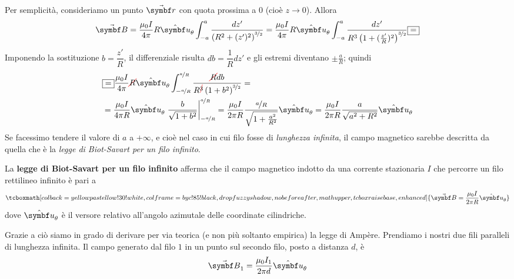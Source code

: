 Per semplicità, consideriamo un punto $\vba{r}$ con quota prossima a $0$ (cioè $z\to 0$). Allora
\begin{equation*}
	\vba{B}=\frac{\mu_0 I}{4\pi}R\vbh{u}_{\theta}\int_{-a}^{a}\frac{dz'}{\left(R^2+(z')^2\right)^{\nicefrac{3}{2}}}=\frac{\mu_0 I}{4\pi}R\vbh{u}_{\theta}\int_{-a}^{a}\frac{dz'}{R^3\left(1+(\frac{z'}{R})^2\right)^{\nicefrac{3}{2}}}\squarequal
\end{equation*}
Imponendo la sostituzione $b=\dfrac{z'}{R}$, il differenziale risulta $db=\dfrac{1}{R}dz'$ e gli estremi diventano $\pm\frac{a}{R}$; quindi
\begin{align*}
	&\squarequal\frac{\mu_0 I}{4\pi}\Ccancel[red]{R}\vbh{u}_{\theta}\int_{-\nicefrac{a}{R}}^{\nicefrac{a}{R}}\frac{\Ccancel[red]{R}db}{R^{\Ccancel[red]{3}}\left(1+b^2\right)^{\nicefrac{3}{2}}}=\\
	&=\frac{\mu_0 I}{4\pi R}\vbh{u}_{\theta}\eval{\frac{b}{\sqrt{1+b^2}}}_{-\nicefrac{a}{R}}^{\nicefrac{a}{R}}=\frac{\mu_0 I}{2\pi R}\frac{\nicefrac{a}{R}}{\sqrt{1+\frac{a^2}{R^2}}}\vbh{u}_{\theta}=\frac{\mu_0 I}{2\pi R}\frac{a}{\sqrt{a^2+R^2}}\vbh{u}_{\theta}
\end{align*}
Se facessimo tendere il valore di $a$ a $+\infty$, e cioè nel caso in cui filo fosse di \textit{lunghezza infinita}, il campo magnetico sarebbe descritta da quella che è la \textit{legge di Biot-Savart per un filo infinito}.
\begin{corollary}
	La \textbf{legge di Biot-Savart per un filo infinito} afferma che il campo magnetico indotto da una corrente stazionaria $I$ che percorre un filo rettilineo infinito è pari a
	\begin{equation}
		\tcboxmath[colback=yellowpastellow!30!white,colframe=byc!85!black,drop fuzzy shadow, nobeforeafter, math upper, tcbox raise base, enhanced]{\vba{B}=\frac{\mu_0 I}{2\pi R}\vbh{u}_{\theta}}
	\end{equation}
	dove $\vbh{u}_{\theta}$ è il versore relativo all'angolo azimutale delle coordinate cilindriche.
\end{corollary}
Grazie a ciò siamo in grado di derivare per via teorica (e non più soltanto empirica) la legge di Ampère. Prendiamo i nostri due fili paralleli di lunghezza infinita. Il campo generato dal filo $1$ in un punto sul secondo filo, posto a distanza $d$, è
\begin{equation*}
	\vba{B}_1=\frac{\mu_0 I_1}{2\pi d}\vbh{u}_\theta
\end{equation*}
